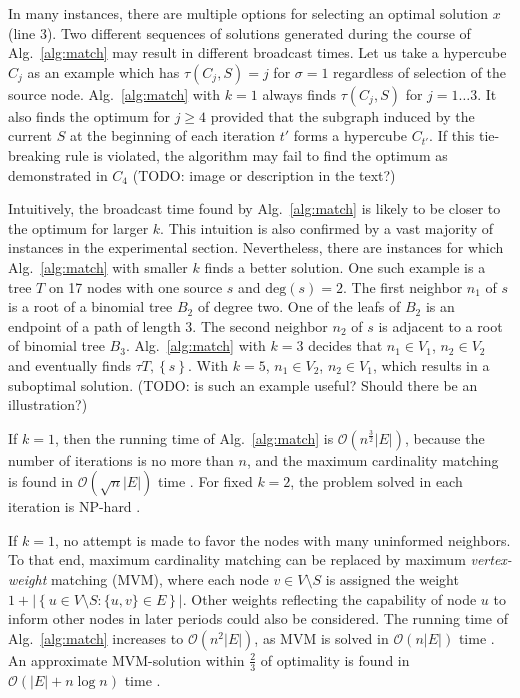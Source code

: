 In many instances, there are multiple options for selecting an optimal solution $x$ (line 3).
Two different sequences of solutions generated during the course of Alg.~\ref{alg:match} may result in different broadcast times.
Let us take a hypercube $C_j$ as an example which has $\tau(C_j,S)=j$ for $\sigma=1$ regardless of selection of the source node.
Alg.~\ref{alg:match} with $k=1$ always finds $\tau(C_j,S)$ for $j=1\dots 3$. 
It also finds the optimum for $j\geq 4$ 
provided that the subgraph induced by the current $S$ at the beginning of each iteration $t'$ forms a hypercube $C_{t'}$.
If this tie-breaking rule is violated, the algorithm may fail to find the optimum as demonstrated in $C_4$ (TODO: image or description in the text?)

Intuitively, the broadcast time found by Alg.~\ref{alg:match} is likely to be closer to the optimum for larger $k$.
This intuition is also confirmed by a vast majority of instances in the experimental section.
Nevertheless, there are instances for which Alg.~\ref{alg:match} with smaller $k$ finds a better solution.
One such example is a tree $T$ on 17 nodes with one source $s$ and $\text{deg}(s)=2$.
The first neighbor $n_1$ of $s$ is a root of a binomial tree $B_2$ of degree two. 
One of the leafs of $B_2$ is an endpoint of a path of length 3.
The second neighbor $n_2$ of $s$ is adjacent to a root of binomial tree $B_3$.
Alg.~\ref{alg:match} with $k=3$ decides that $n_1\in V_1$, $n_2\in V_2$ and eventually finds $\tau{T,\left\{s\right\}}$.
With $k=5$, $n_1\in V_2$, $n_2\in V_1$, which results in a suboptimal solution.
(TODO: is such an example useful? Should there be an illustration?)


\begin{remark} \label{rem:time}
If $k=1$, then the running time of Alg.\ \ref{alg:match} is $\mathcal{O}\left(n^{\frac{3}{2}}|E|\right)$, because the number of iterations is no more than $n$,
and the maximum cardinality matching is found in $\mathcal{O}\left(\sqrt{n}|E|\right)$ time \cite{hopcroft73}.
For fixed $k=2$, the problem solved in each iteration is NP-hard \cite{jansen95}.
\end{remark}

\begin{remark} \label{rem:mvm}
If $k=1$, no attempt is made to favor the nodes with many uninformed neighbors.
To that end, maximum cardinality matching can be replaced by maximum \emph{vertex-weight} matching (MVM),
where each node $v\in V\setminus S$ is assigned the weight $1+\left|\left\{u\in V\setminus S: \{u,v\}\in E\right\}\right|$.
Other weights reflecting the capability of node $u$ to inform other nodes in later periods could also be considered.
The running time of Alg.\ \ref{alg:match} increases to $\mathcal{O}\left(n^2|E|\right)$, as MVM
is solved in $\mathcal{O}\left(n|E|\right)$ time \cite{dobrian19}.
An approximate MVM-solution within $\frac{2}{3}$ of optimality is found in $\mathcal{O}\left(|E|+n\log{n}\right)$ time \cite{dobrian19}.
\end{remark}
